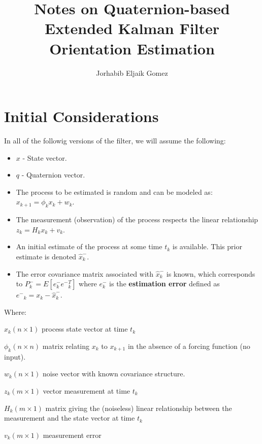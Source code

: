 \documentclass[a4paper,10pt]{article}
\title{Notes on Quaternion-based Extended Kalman Filter Orientation Estimation}
\author{Jorhabib Eljaik Gomez}
\date{}
\begin{document}
\maketitle


\section{Initial Considerations}
In all of the followig versions of the filter, we will assume the following:

\begin{itemize}
 \item $x$ - State vector.
 \item $q$ - Quaternion vector.
 \item The process to be estimated is random and can be modeled as:
 $x_{k+1} = \phi_k x_k + w_k$.
 \item The measurement (observation) of the process respects the linear relationship $z_k = H_k x_k + v_k$.
 \item An initial estimate of the process at some time $t_k$ is available. This prior estimate is denoted $\hat{x}^{-}_k$.
 \item  The error covariance matrix associated with $\hat{x}^{-}_k$ is known, which corresponds to $P^{-}_k = E[e^{-}_k {e^{-}}^T_k]$ where $e^{-}_k$ is the \textbf{estimation error} defined as ${e^{-}}_k = x_k - \hat{x}^{-}_k$.
\end{itemize}

Where:
\begin{list}{variables}{}
 \item $x_k (n \times 1)$ process state vector at time $t_k$
 \item $\phi_k (n \times n)$ matrix relating $x_k$ to $x_{k+1}$ in the absence of a forcing function (no input).
 \item $w_k (n \times 1)$ noise vector with known covariance structure.
 \item $z_k (m \times 1)$ vector measurement at time $t_k$
 \item $H_k (m \times 1)$ matrix giving the (noiseless) linear relationship between the measurement and the state vector at time $t_k$
 \item $v_k (m \times 1)$ measurement error
\end{list}
\end{document}
